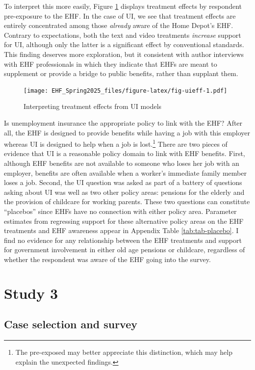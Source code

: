 \documentclass[
  11pt,
  oneside]{article}
\begin{document}
To interpret this more easily, Figure \ref{fig:fig-uieff} displays treatment effects by respondent pre-exposure to the EHF. In the case of UI, we see that treatment effects are entirely concentrated among those \emph{already} aware of the Home Depot's EHF. Contrary to expectations, both the text and video treatments \emph{increase} support for UI, although only the latter is a significant effect by conventional standards. This finding deserves more exploration, but it consistent with author interviews with EHF professionals in which they indicate that EHFs are meant to supplement or provide a bridge to public benefits, rather than supplant them.

\begin{figure}
\centering
\texttt{[image: EHF\_Spring2025\_files/figure-latex/fig-uieff-1.pdf]}
\caption{\label{fig:fig-uieff}Interpreting treatment effects from UI models}
\end{figure}

Is unemployment insurance the appropriate policy to link with the EHF? After all, the EHF is designed to provide benefits while having a job with this employer whereas UI is designed to help when a job is lost.\footnote{The pre-exposed may better appreciate this distinction, which may help explain the unexpected findings.} There are two pieces of evidence that UI is a reasonable policy domain to link with EHF benefits. First, although EHF benefits are not available to someone who loses her job with an employer, benefits are often available when a worker's immediate family member loses a job. Second, the UI question was asked as part of a battery of questions asking about UI was well as two other policy areas: pensions for the elderly and the provision of childcare for working parents. These two questions can constitute ``placebos'' since EHFs have no connection with either policy area. Parameter estimates from regressing support for these alternative policy areas on the EHF treatments and EHF awareness appear in Appendix Table \ref{tab:tab-placebo}. I find no evidence for any relationship between the EHF treatments and support for government involvement in either old age pensions or childcare, regardless of whether the respondent was aware of the EHF going into the survey.

\section{Study 3}\label{study-3}

\subsection{Case selection and survey}\label{case-selection-and-survey}
\end{document}
